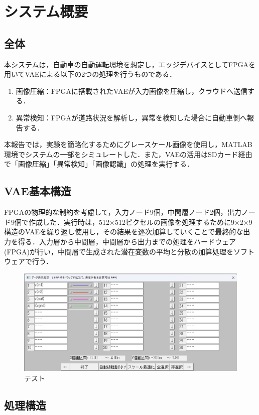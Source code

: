\documentclass[paper]{ieicej}
\begin{document}
\section{システム概要}
\subsection{全体}
本システムは，自動車の自動運転環境を想定し，エッジデバイスとしてFPGAを用いてVAEによる以下の2つの処理を行うものである．
\begin{enumerate}
\item 画像圧縮：FPGAに搭載されたVAEが入力画像を圧縮し，クラウドへ送信する．
\item 異常検知：FPGAが道路状況を解析し，異常を検知した場合に自動車側へ報告する．
\end{enumerate}
本報告では，実験を簡略化するためにグレースケール画像を使用し，MATLAB環境でシステムの一部をシミュレートした．また，VAEの活用はSDカード経由で「画像圧縮」「異常検知」「画像認識」の処理を実行する．

\subsection{VAE基本構造}
FPGAの物理的な制約を考慮して，入力ノード9個，中間層ノード2個，出力ノード9個で作成した．実行時は，512×512ピクセルの画像を処理するために9×2×9構造のVAEを繰り返し使用し，その結果を逐次加算していくことで最終的な出力を得る．入力層から中間層，中間層から出力までの処理をハードウェア(FPGA)が行い，中間層で生成された潜在変数の平均と分散の加算処理をソフトウェアで行う．

\begin{figure}[htbp]
    \includegraphics[width=0.9\columnwidth]{figures/test.png}
    \caption{テスト}
    \label{fig:test}
\end{figure}

\subsection{処理構造}
\end{document}
